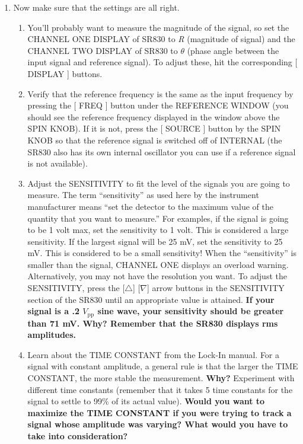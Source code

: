 \documentclass{../lab}
\begin{document}
\begin{enumerate}
\begin{enumerate}
    \end{enumerate}

    \item Now make sure that the settings are all right.
    \begin{enumerate}
        \item You'll probably want to measure the magnitude of the signal, so set the CHANNEL ONE DISPLAY of SR830 to \emph{R} (magnitude of signal) and the CHANNEL TWO DISPLAY of SR830 to $\theta$ (phase angle between the input signal and reference signal). To adjust these, hit the corresponding [ DISPLAY ] buttons.

        \item Verify that the reference frequency is the same as the input frequency by pressing the [ FREQ ] button under the REFERENCE WINDOW (you should see the reference frequency displayed in the window above the SPIN KNOB). If it is not, press the [ SOURCE ] button by the SPIN KNOB so that the reference signal is switched off of INTERNAL (the SR830 also has its own internal oscillator you can use if a reference signal is not available).

        \item Adjust the SENSITIVITY to fit the level of the signals you are going to measure. The term ``sensitivity'' as used here by the instrument manufacturer means ``set the detector to the maximum value of the quantity that you want to measure.'' For examples, if the signal is going to be 1 volt max, set the sensitivity to 1 volt. This is considered a large sensitivity. If the largest signal will be 25 mV, set the sensitivity to 25 mV. This is considered to be a small sensitivity! When the ``sensitivity'' is smaller than the signal, CHANNEL ONE displays an overload warning. Alternatively, you may not have the resolution you want. To adjust the SENSITIVITY, press the [$\triangle$] [$\nabla$] arrow buttons in the SENSITIVITY section of the SR830 until an appropriate value is attained. \textbf{If your signal is a .2 $V_\text{pp}$ sine wave, your sensitivity should be greater than 71 mV. Why? Remember that the SR830 displays rms amplitudes.}

        \item Learn about the TIME CONSTANT\emph{ }from the Lock-In manual. For a signal with constant amplitude, a general rule is that the larger the TIME CONSTANT, the more stable the measurement. \textbf{Why? }Experiment with different time constants (remember that it takes 5 time constants for the signal to settle to 99\% of its actual value). \textbf{Would you want to maximize the TIME CONSTANT if you were trying to track a signal whose amplitude was varying? What would you have to take into consideration?}


\end{enumerate}
\end{enumerate}
\end{document}
